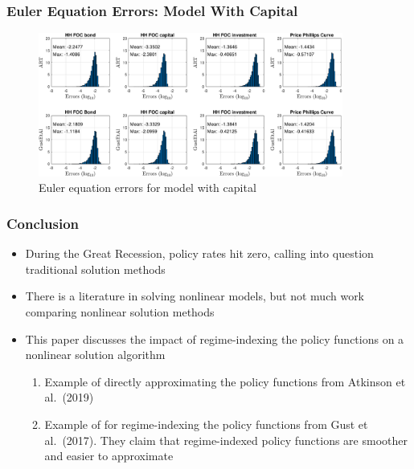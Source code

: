 \documentclass[11pt]{beamer}
\begin{document}
\begin{frame}\frametitle{Euler Equation Errors: Model With Capital}
\begin{figure}[H]
    \centering
\captionsetup{justification=centering}
    \includegraphics[width=10cm,scale=.8]{../Paper/eeerrorsCAP.pdf}
  \caption{Euler equation errors for model with capital}    
  \end{figure}
\end{frame}%
\begin{frame}\frametitle{Conclusion}
\begin{itemize}\setlength{\itemsep}{8pt}
\item <1-|handout:1>During the Great Recession, policy rates hit zero, calling into question traditional solution methods
\item <2-|handout:1>There is a literature in solving nonlinear models, but not much work comparing nonlinear solution methods
\item <3-|handout:1>This paper discusses the impact of regime-indexing the policy functions on a nonlinear solution algorithm
\begin{enumerate}\setlength{\itemsep}{4pt}
\item Example of directly approximating the policy functions from Atkinson et al.\ (2019)
\item Example of for regime-indexing the policy functions from Gust et al.\ (2017). They claim that regime-indexed policy functions are smoother and easier to approximate
\end{enumerate}

\end{itemize}
\end{frame}
\end{document}
